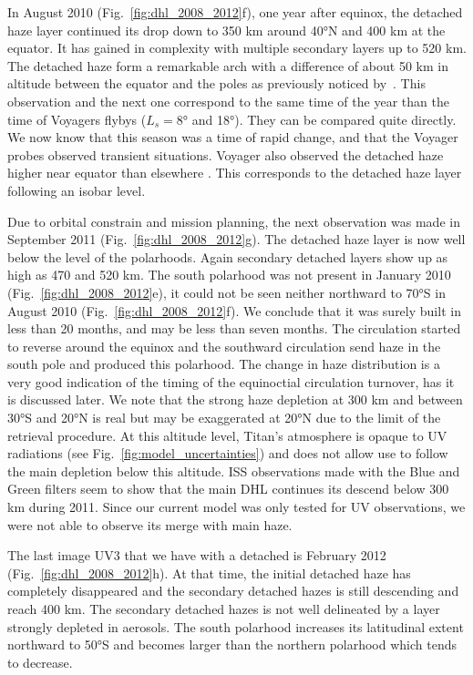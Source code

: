 In August 2010 (Fig.~\ref{fig:dhl_2008_2012}f), one year after equinox, the detached haze layer continued
its drop down to 350 km around \ang{40}N and 400 km at the equator. It has gained in complexity with
multiple secondary layers up to 520 km. The detached haze form a remarkable arch with a difference of about 50 km
in altitude between the equator and the poles as previously noticed by~\cite{West2011}.
This observation and the next one correspond to the same time of the
year than the time of Voyagers flybys ($L_s=\ang{8}$ and \ang{18}). They can be compared quite directly. We now know
that this season was a time of rapid change, and that the Voyager probes observed transient situations. Voyager also
observed the detached haze higher near equator than elsewhere \citep{Rages1983, Rannou2000}. This corresponds to
the detached haze layer following an isobar level.

Due to orbital constrain and mission planning, the next observation was made in September 2011
(Fig.~\ref{fig:dhl_2008_2012}g). The detached haze layer is now well below the level of the polarhoods.
Again secondary detached layers show up as high as 470 and 520 km.
The south polarhood was not present in January 2010 (Fig.~\ref{fig:dhl_2008_2012}e), it could not be seen
neither northward to \ang{70}S in August 2010 (Fig.~\ref{fig:dhl_2008_2012}f). We conclude that it was surely
built in less than 20 months, and may be less than seven months. The circulation started to reverse around the equinox
and the southward circulation send haze in the south pole and produced this polarhood. The change in haze distribution
is a very good indication of the timing of the equinoctial circulation turnover, has it is discussed later. We note
that the strong haze depletion at 300 km and between \ang{30}S and \ang{20}N is real but may be exaggerated at \ang{20}N
due to the limit of the retrieval procedure. At this altitude level, Titan's atmosphere is opaque to UV radiations
(see Fig.~\ref{fig:model_uncertainties}) and does not allow use to follow the main depletion below this altitude.
ISS observations made with the Blue and Green filters seem to show that the main DHL continues
its descend below 300 km during 2011. Since our current model was only tested for UV observations, we were not able
to observe its merge with main haze.

The last image UV3 that we have with a detached is February 2012 (Fig.~\ref{fig:dhl_2008_2012}h). At that
time, the initial detached haze has completely disappeared and the secondary detached hazes is still descending
and reach 400 km. The secondary detached hazes is not well delineated by a layer strongly depleted in aerosols.
The south polarhood increases its latitudinal extent northward to \ang{50}S and becomes larger than the northern
polarhood which tends to decrease.
